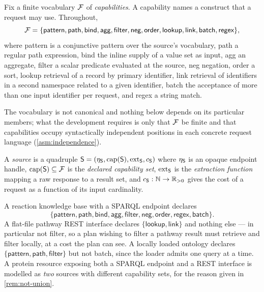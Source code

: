 \begin{definition}
\label{def:capability}
Fix a finite vocabulary $\mathcal{F}$ of \emph{capabilities}. A capability names a
construct that a request may use. Throughout,
\[
\mathcal{F} = \{\textsf{pattern}, \textsf{path}, \textsf{bind}, \textsf{agg},
\textsf{filter}, \textsf{neg}, \textsf{order}, \textsf{lookup},
\textsf{link}, \textsf{batch}, \textsf{regex}\},
\]
where \textsf{pattern} is a conjunctive pattern over the source's vocabulary,
\textsf{path} a regular path expression, \textsf{bind} the inline supply of a
value set as input, \textsf{agg} an aggregate, \textsf{filter} a scalar
predicate evaluated at the source, \textsf{neg} negation, \textsf{order} a
sort, \textsf{lookup} retrieval of a record by primary identifier,
\textsf{link} retrieval of identifiers in a second namespace related to a given
identifier, \textsf{batch} the acceptance of more than one input identifier per
request, and \textsf{regex} a string match.
\end{definition}

The vocabulary is not canonical and nothing below depends on its particular
members; what the development requires is only that $\mathcal{F}$ be finite and that
capabilities occupy syntactically independent positions in each concrete
request language (\cref{asm:independence}).

\begin{definition}[Source]
\label{def:source}
A \emph{source} is a quadruple
$\mathsf{S} = (\eta_{\mathsf{S}}, \mathrm{cap}(\mathsf{S}), \mathrm{ext}_{\mathsf{S}}, c_{\mathsf{S}})$
where $\eta_{\mathsf{S}}$ is an opaque endpoint handle, $\mathrm{cap}(\mathsf{S}) \subseteq \mathcal{F}$ is
the \emph{declared capability set}, $\mathrm{ext}_{\mathsf{S}}$ is the \emph{extraction
function} mapping a raw response to a result set, and
$c_{\mathsf{S}} : \mathbb{N} \to \mathbb{R}_{>0}$ gives the cost of a request as a function
of its input cardinality.
\end{definition}

\begin{example}
\label{ex:sources}
A reaction knowledge base with a SPARQL endpoint declares
\[
\{\textsf{pattern},\textsf{path},\textsf{bind},\textsf{agg},\textsf{filter},
\textsf{neg},\textsf{order},\textsf{regex},\textsf{batch}\}.
\]
A flat-file pathway REST interface declares $\{\textsf{lookup},\textsf{link}\}$
and nothing else --- in particular not \textsf{filter}, so a plan wishing to
filter a pathway result must retrieve and filter locally, at a cost the plan
can see. A locally loaded ontology declares
$\{\textsf{pattern},\textsf{path},\textsf{filter}\}$ but not \textsf{batch},
since the loader admits one query at a time. A protein resource exposing both a
SPARQL endpoint and a REST interface is modelled as \emph{two} sources with
different capability sets, for the reason given in \cref{rem:not-union}.
\end{example}

